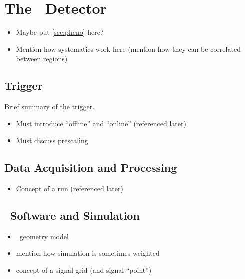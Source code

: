 \section{The \atlas\ Detector}
\label{sec:atlas}
\begin{itemize}
\item Maybe put \cref{sec:pheno} here?
\item Mention how systematics work here (mention how they can be correlated between regions)
\end{itemize}
\subsection{Trigger}
\label{sec:trigger}
Brief summary of the trigger.
\begin{itemize}
\item Must introduce ``offline'' and ``online'' (referenced later)
\item Must discuss prescaling
\end{itemize}
\subsection{Data Acquisition and Processing}
\begin{itemize}
\item Concept of a run (referenced later)
\end{itemize}
\subsection{\atlas\ Software and Simulation}
\label{sec:software}
\begin{itemize}
\item \atlas\ geometry model
\item mention how simulation is sometimes weighted
\item concept of a signal grid (and signal ``point'')
\end{itemize}

